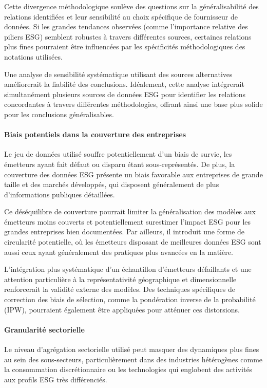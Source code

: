 Cette divergence méthodologique soulève des questions sur la généralisabilité des relations identifiées et leur sensibilité au choix spécifique de fournisseur de données. Si les grandes tendances observées (comme l'importance relative des piliers ESG) semblent robustes à travers différentes sources, certaines relations plus fines pourraient être influencées par les spécificités méthodologiques des notations utilisées.

Une analyse de sensibilité systématique utilisant des sources alternatives améliorerait la fiabilité des conclusions. Idéalement, cette analyse intégrerait simultanément plusieurs sources de données ESG pour identifier les relations concordantes à travers différentes méthodologies, offrant ainsi une base plus solide pour les conclusions généralisables.

\paragraph{Biais potentiels dans la couverture des entreprises} 
Le jeu de données utilisé souffre potentiellement d'un biais de survie, les émetteurs ayant fait défaut ou disparu étant sous-représentés. De plus, la couverture des données ESG présente un biais favorable aux entreprises de grande taille et des marchés développés, qui disposent généralement de plus d'informations publiques détaillées.

Ce déséquilibre de couverture pourrait limiter la généralisation des modèles aux émetteurs moins couverts et potentiellement surestimer l'impact ESG pour les grandes entreprises bien documentées. Par ailleurs, il introduit une forme de circularité potentielle, où les émetteurs disposant de meilleures données ESG sont aussi ceux ayant généralement des pratiques plus avancées en la matière.

L'intégration plus systématique d'un échantillon d'émetteurs défaillants et une attention particulière à la représentativité géographique et dimensionnelle renforcerait la validité externe des modèles. Des techniques spécifiques de correction des biais de sélection, comme la pondération inverse de la probabilité (IPW), pourraient également être appliquées pour atténuer ces distorsions.

\paragraph{Granularité sectorielle} 
Le niveau d'agrégation sectorielle utilisé peut masquer des dynamiques plus fines au sein des sous-secteurs, particulièrement dans des industries hétérogènes comme la consommation discrétionnaire ou les technologies qui englobent des activités aux profils ESG très différenciés.

